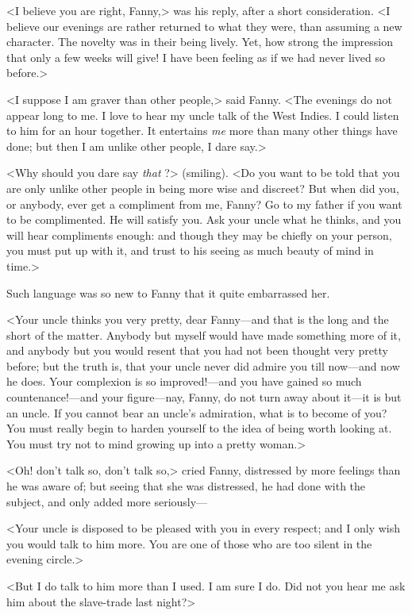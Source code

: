 <I believe you are right, Fanny,> was his reply, after a short consideration. <I believe our evenings are rather returned to what they were, than assuming a new character. The novelty was in their being lively. Yet, how strong the impression that only a few weeks will give! I have been feeling as if we had never lived so before.>

<I suppose I am graver than other people,> said Fanny. <The evenings do not appear long to me. I love to hear my uncle talk of the West Indies. I could listen to him for an hour together. It entertains \textit{me}  more than many other things have done; but then I am unlike other people, I dare say.>

<Why should you dare say \textit{that} ?> (smiling). <Do you want to be told that you are only unlike other people in being more wise and discreet? But when did you, or anybody, ever get a compliment from me, Fanny? Go to my father if you want to be complimented. He will satisfy you. Ask your uncle what he thinks, and you will hear compliments enough: and though they may be chiefly on your person, you must put up with it, and trust to his seeing as much beauty of mind in time.>

Such language was so new to Fanny that it quite embarrassed her.

<Your uncle thinks you very pretty, dear Fanny—and that is the long and the short of the matter. Anybody but myself would have made something more of it, and anybody but you would resent that you had not been thought very pretty before; but the truth is, that your uncle never did admire you till now—and now he does. Your complexion is so improved!—and you have gained so much countenance!—and your figure—nay, Fanny, do not turn away about it—it is but an uncle. If you cannot bear an uncle's admiration, what is to become of you? You must really begin to harden yourself to the idea of being worth looking at. You must try not to mind growing up into a pretty woman.>

<Oh! don't talk so, don't talk so,> cried Fanny, distressed by more feelings than he was aware of; but seeing that she was distressed, he had done with the subject, and only added more seriously—

<Your uncle is disposed to be pleased with you in every respect; and I only wish you would talk to him more. You are one of those who are too silent in the evening circle.>

<But I do talk to him more than I used. I am sure I do. Did not you hear me ask him about the slave-trade last night?>


